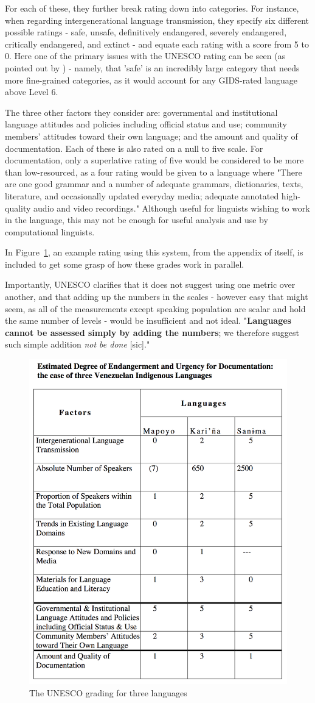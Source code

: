 For each of these, they further break rating down into categories. For instance, when regarding intergenerational language transmission, they specify six different possible ratings - safe, unsafe, definitively endangered, severely endangered, critically endangered, and extinct - and equate each rating with a score from 5 to 0. Here one of the primary issues with the UNESCO rating can be seen  (as pointed out by \citet{lewis2010assessing}) - namely, that 'safe' is an incredibly large category that needs more fine-grained categories, as it would account for any GIDS-rated language above Level 6.

The three other factors they consider are: governmental and institutional language attitudes and policies including official status and use; community members' attitudes toward their own language; and the amount and quality of documentation. Each of these is also rated on a null to five scale. For documentation, only a superlative rating of five would be considered to be more than low-resourced, as a four rating would be given to a language where "There are one good grammar and a number of adequate grammars, dictionaries, texts, literature, and occasionally updated everyday media; adequate annotated high-quality audio and video recordings." Although useful for linguists wishing to work in the language, this may not be enough for useful analysis and use by computational linguists. %

In Figure~\ref{fig:unesco}, an example rating using this system, from the appendix of \citet{brenzinger2003language} itself, is included to get some grasp of how these grades work in parallel.

Importantly, UNESCO clarifies that it does not suggest using one metric over another, and that adding up the numbers in the scales - however easy that might seem, as all of the measurements except speaking population are scalar and hold the same number of levels - would be insufficient and not ideal. "\textbf{Languages cannot be assessed simply by adding the numbers}; we therefore suggest such simple addition \textit{not be done} [sic]."

\begin{figure}
 \centering
 \includegraphics[width=.5\textwidth]{img/unesco.png}
 \caption{The UNESCO grading for three languages \citep[23]{brenzinger2003language}}
 \label{fig:unesco}
\end{figure}

